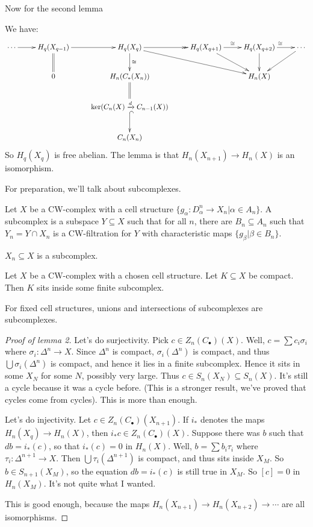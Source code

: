 Now for the second lemma
\begin{lemma}
We have:
\begin{equation*}
\xymatrix{\ar[r]\cdots & H_q(X_{q-1})\ar[r]\ar@{=}[d] & H_q(X_q)\ar@{->>}[r]\ar[d]^\cong\ar[drr] & H_q(X_{q+1})\ar[r]^\cong\ar[dr] & H_q(X_{q+2})\ar[d]\ar[r]^\cong & \cdots\ar[dl]\\
& 0 & H_n(C_\ast(X_n))\ar@{=}[d] & & H_n(X) \\
& & \ker(C_n(X)\xrightarrow{d}C_{n-1}(X))\ar@{^(->}[d] & &\\
& & C_n(X_n) & &}
\end{equation*}
So $ H_q(X_q)$ is free abelian. The lemma is that $ H_n(X_{n+1})\to H_n(X)$ is an isomorphism.
\end{lemma}
For preparation, we'll talk about subcomplexes.
\begin{definition}
Let $X$ be a CW-complex with a cell structure $\{g_\alpha:D^n_\alpha\to X_n|\alpha\in A_n\}$. A subcomplex is a subspace $Y\subseteq X$ such that for all $n$, there are $B_n\subseteq A_n$ such that $Y_n=Y\cap X_n$ is a CW-filtration for $Y$ with characteristic maps $\{g_\beta|\beta\in B_n\}$.
\end{definition}
\begin{example}
$X_n\subseteq X$ is a subcomplex.
\end{example}
\begin{prop}[Bredon, p. 196]
Let $X$ be a CW-complex with a chosen cell structure. Let $K\subseteq X$ be compact. Then $K$ sits inside some finite subcomplex. 
\end{prop}
\begin{remark}
For fixed cell structures, unions and intersections of subcomplexes are subcomplexes.
\end{remark}
\begin{proof}[Proof of lemma 2]
Let's do surjectivity. Pick $c\in Z_n(C_\bullet)(X)$. Well, $c=\sum c_i\sigma_i$ where $\sigma_i:\Delta^n\to X$. Since $\Delta^n$ is compact, $\sigma_i(\Delta^n)$ is compact, and thus $\bigcup\sigma_i(\Delta^n)$ is compact, and hence it lies in a finite subcomplex. Hence it sits in some $X_N$ for some $N$, possibly very large. Thus $c\in S_n(X_N)\subseteq S_n(X)$. It's still a cycle because it was a cycle before. (This is a stronger result, we've proved that cycles come from cycles). This is more than enough.

Let's do injectivity. Let $c\in Z_n(C_\bullet)(X_{n+1})$. If $i_\ast$ denotes the maps $ H_n(X_q)\to H_n(X)$, then $i_\ast c\in Z_n(C_\bullet)(X)$. Suppose there was $b$ such that $db=i_\ast(c)$, so that $i_\ast(c)=0$ in $ H_n(X)$. Well, $b=\sum b_i \tau_i$ where $\tau_i:\Delta^{n+1}\to X$. Then $\bigcup \tau_i(\Delta^{n+1})$ is compact, and thus sits inside $X_M$. So $b\in S_{n+1}(X_M)$, so the equation $db=i_\ast(c)$ is still true in $X_M$. So $[c]=0$ in $ H_n(X_M)$. It's not quite what I wanted.

This is good enough, because the maps $ H_n(X_{n+1})\to H_n(X_{n+2})\to \cdots$ are all isomorphisms.
\end{proof}
